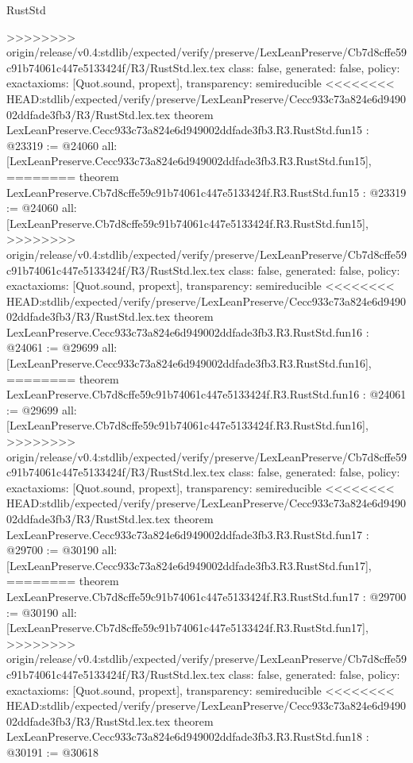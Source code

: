 \begin{lexlean}{RustStd}
\begin{coremodule}
{\begin{coremodule}
{{{{{{{{{{{{{{{{{{>>>>>>>> origin/release/v0.4:stdlib/expected/verify/preserve/LexLeanPreserve/Cb7d8cffe59c91b74061c447e5133424f/R3/RustStd.lex.tex
  class: false,
  generated: false,
  policy: exact{axioms: [Quot.sound, propext]},
  transparency: semireducible
}
<<<<<<<< HEAD:stdlib/expected/verify/preserve/LexLeanPreserve/Cecc933c73a824e6d949002ddfade3fb3/R3/RustStd.lex.tex
theorem LexLeanPreserve.Cecc933c73a824e6d949002ddfade3fb3.R3.RustStd.fun15 : @23319 := @24060 {
  all: [LexLeanPreserve.Cecc933c73a824e6d949002ddfade3fb3.R3.RustStd.fun15],
========
theorem LexLeanPreserve.Cb7d8cffe59c91b74061c447e5133424f.R3.RustStd.fun15 : @23319 := @24060 {
  all: [LexLeanPreserve.Cb7d8cffe59c91b74061c447e5133424f.R3.RustStd.fun15],
>>>>>>>> origin/release/v0.4:stdlib/expected/verify/preserve/LexLeanPreserve/Cb7d8cffe59c91b74061c447e5133424f/R3/RustStd.lex.tex
  class: false,
  generated: false,
  policy: exact{axioms: [Quot.sound, propext]},
  transparency: semireducible
}
<<<<<<<< HEAD:stdlib/expected/verify/preserve/LexLeanPreserve/Cecc933c73a824e6d949002ddfade3fb3/R3/RustStd.lex.tex
theorem LexLeanPreserve.Cecc933c73a824e6d949002ddfade3fb3.R3.RustStd.fun16 : @24061 := @29699 {
  all: [LexLeanPreserve.Cecc933c73a824e6d949002ddfade3fb3.R3.RustStd.fun16],
========
theorem LexLeanPreserve.Cb7d8cffe59c91b74061c447e5133424f.R3.RustStd.fun16 : @24061 := @29699 {
  all: [LexLeanPreserve.Cb7d8cffe59c91b74061c447e5133424f.R3.RustStd.fun16],
>>>>>>>> origin/release/v0.4:stdlib/expected/verify/preserve/LexLeanPreserve/Cb7d8cffe59c91b74061c447e5133424f/R3/RustStd.lex.tex
  class: false,
  generated: false,
  policy: exact{axioms: [Quot.sound, propext]},
  transparency: semireducible
}
<<<<<<<< HEAD:stdlib/expected/verify/preserve/LexLeanPreserve/Cecc933c73a824e6d949002ddfade3fb3/R3/RustStd.lex.tex
theorem LexLeanPreserve.Cecc933c73a824e6d949002ddfade3fb3.R3.RustStd.fun17 : @29700 := @30190 {
  all: [LexLeanPreserve.Cecc933c73a824e6d949002ddfade3fb3.R3.RustStd.fun17],
========
theorem LexLeanPreserve.Cb7d8cffe59c91b74061c447e5133424f.R3.RustStd.fun17 : @29700 := @30190 {
  all: [LexLeanPreserve.Cb7d8cffe59c91b74061c447e5133424f.R3.RustStd.fun17],
>>>>>>>> origin/release/v0.4:stdlib/expected/verify/preserve/LexLeanPreserve/Cb7d8cffe59c91b74061c447e5133424f/R3/RustStd.lex.tex
  class: false,
  generated: false,
  policy: exact{axioms: [Quot.sound, propext]},
  transparency: semireducible
}
<<<<<<<< HEAD:stdlib/expected/verify/preserve/LexLeanPreserve/Cecc933c73a824e6d949002ddfade3fb3/R3/RustStd.lex.tex
theorem LexLeanPreserve.Cecc933c73a824e6d949002ddfade3fb3.R3.RustStd.fun18 : @30191 := @30618 {
}}}}}}}}}}}}}}}}}}}}}
\end{coremodule}}
\end{coremodule}
\end{lexlean}
